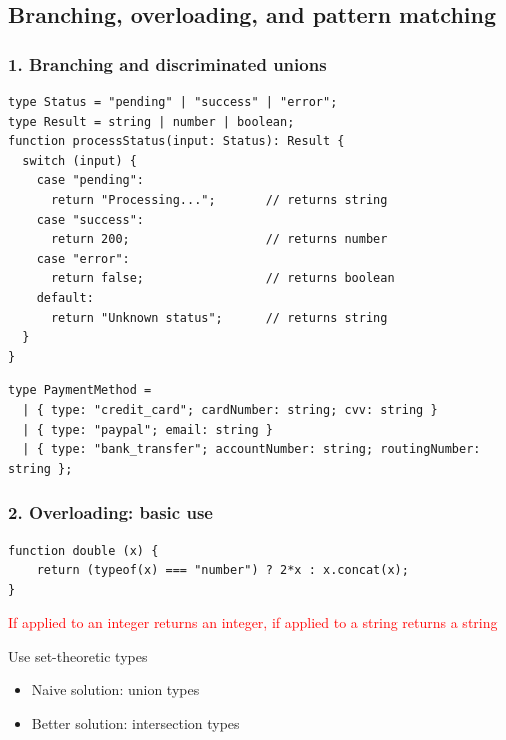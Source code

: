 \subsection{Branching, overloading, and pattern matching}

\begin{frame}[fragile]\transdissolve
\frametitle{1. Branching and discriminated unions}\vspace{-4mm}
\small
\begin{verbatim}
type Status = "pending" | "success" | "error";
type Result = string | number | boolean;
function processStatus(input: Status): Result {
  switch (input) {
    case "pending":
      return "Processing...";       // returns string
    case "success":
      return 200;                   // returns number
    case "error":
      return false;                 // returns boolean
    default:
      return "Unknown status";      // returns string
  }
}
\end{verbatim}
\pause


\begin{verbatim}
type PaymentMethod = 
  | { type: "credit_card"; cardNumber: string; cvv: string }
  | { type: "paypal"; email: string }
  | { type: "bank_transfer"; accountNumber: string; routingNumber: string };
\end{verbatim}
\end{frame}



\begin{frame}[fragile]\transdissolve
  \frametitle{2. Overloading: basic use}

\smallskip

\begin{verbatim}
function double (x) {
    return (typeof(x) === "number") ? 2*x : x.concat(x);
}
\end{verbatim}
\textcolor<4>{red}{If applied to an integer returns an integer, if applied to a string returns a string}
  \pause
\begin{exampleblock}{Use set-theoretic types}
  \begin{itemize}
    \pause
     \item Naive solution: union types
       \centerline{}
       \pause\pause
     \item Better solution: intersection types
       \centerline{}
  \end{itemize}
\end{exampleblock}
\end{frame}


